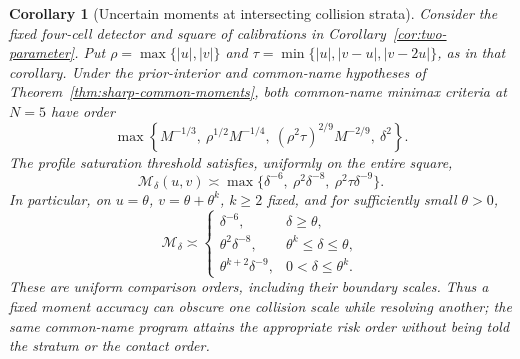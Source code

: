 \documentclass[11pt]{amsart}
\newtheorem{corollary}[theorem]{Corollary}
\theoremstyle{definition}\newtheorem{definition}[theorem]{Definition}
\theoremstyle{remark}\newtheorem{remark}[theorem]{Remark}
\begin{document}
\begin{corollary}[Uncertain moments at intersecting collision strata]
\label{cor:uncertain-intersections}
Consider the fixed four-cell detector and square of calibrations in
Corollary~\ref{cor:two-parameter}. Put
$\rho=\max\{|u|,|v|\}$ and
$\tau=\min\{|u|,|v-u|,|v-2u|\}$, as in that corollary.
Under the prior-interior and common-name hypotheses of
Theorem~\ref{thm:sharp-common-moments}, both common-name minimax
criteria at $N=5$ have order
\begin{equation}\label{eq:noisy-intersection-risk}
 \max\left\{M^{-1/3},\ \rho^{1/2}M^{-1/4},\
              (\rho^2\tau)^{2/9}M^{-2/9},\ \delta^2\right\}.
\end{equation}
The profile saturation threshold satisfies, uniformly on the entire square,
\begin{equation}\label{eq:noisy-intersection-threshold}
 \mathcal M_\delta(u,v)\asymp
 \max\{\delta^{-6},\ \rho^2\delta^{-8},\ \rho^2\tau\delta^{-9}\}.
\end{equation}
In particular, on $u=\theta$, $v=\theta+\theta^k$, $k\ge2$ fixed,
and for sufficiently small $\theta>0$,
\begin{equation}\label{eq:noisy-tangency-phases}
 \mathcal M_\delta\asymp
 \begin{cases}
   \delta^{-6},&\delta\ge\theta,\\
   \theta^2\delta^{-8},&\theta^k\le\delta\le\theta,\\
   \theta^{k+2}\delta^{-9},&0<\delta\le\theta^k.
 \end{cases}
\end{equation}
These are uniform comparison orders, including their boundary scales.
Thus a fixed moment accuracy can obscure one collision scale while
resolving another; the same common-name program attains the appropriate
risk order without being told the stratum or the contact order.
\end{corollary}
\end{document}
